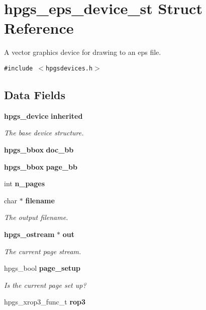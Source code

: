 \section{hpgs\_\-eps\_\-device\_\-st Struct Reference}
\label{structhpgs__eps__device__st}
A vector graphics device for drawing to an eps file.  


{\tt \#include $<$hpgsdevices.h$>$}

\subsection*{Data Fields}
\begin{CompactItemize}
\item 
{\bf hpgs\_\-device} {\bf inherited}\label{structhpgs__eps__device__st_f985e290744ee409439ed1870b6f7003}

\begin{CompactList}\small\item\em The base device structure. \item\end{CompactList}\item 
{\bf hpgs\_\-bbox} \textbf{doc\_\-bb}\label{structhpgs__eps__device__st_86f192552c39e581d72aefb268c21cd1}

\item 
{\bf hpgs\_\-bbox} {\bf page\_\-bb}
\item 
int {\bf n\_\-pages}
\item 
char $\ast$ {\bf filename}
\begin{CompactList}\small\item\em The output filename. \item\end{CompactList}\item 
{\bf hpgs\_\-ostream} $\ast$ {\bf out}\label{structhpgs__eps__device__st_b89548e41f4befb13c7ce0aca6829f66}

\begin{CompactList}\small\item\em The current page stream. \item\end{CompactList}\item 
hpgs\_\-bool {\bf page\_\-setup}\label{structhpgs__eps__device__st_504b15d2a3068d155b9bbbc9b7eb983b}

\begin{CompactList}\small\item\em Is the current page set up? \item\end{CompactList}\item 
hpgs\_\-xrop3\_\-func\_\-t {\bf rop3}\label{structhpgs__eps__device__st_1480c62b7e21dfeb710a618951e02c5a}


\end{CompactItemize}
